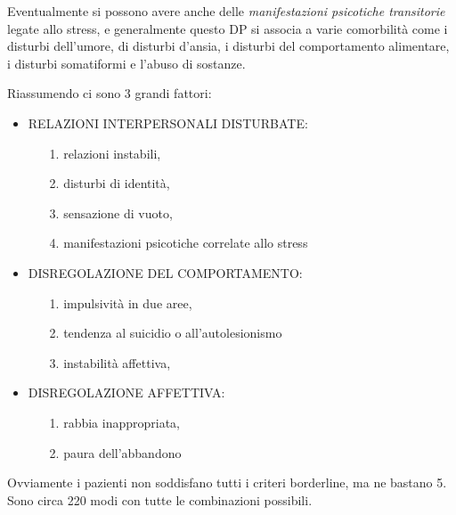 Eventualmente si possono avere anche delle \emph{manifestazioni
psicotiche transitorie} legate allo stress, e generalmente questo DP si
associa a varie comorbilità come i disturbi dell'umore, di disturbi
d'ansia, i disturbi del comportamento alimentare, i disturbi somatiformi
e l'abuso di sostanze.

Riassumendo ci sono 3 grandi fattori:

\begin{itemize}
\item
  RELAZIONI INTERPERSONALI DISTURBATE:

\begin{itemize}
\item[1.]
  relazioni instabili,
\item[2.]
  disturbi di identità,
\item[3.]
  sensazione di vuoto,
\item[4.]
  manifestazioni psicotiche correlate allo stress
\end{itemize}

\item
  DISREGOLAZIONE DEL COMPORTAMENTO:

\begin{itemize}
\item[1.]
  impulsività in due aree,
\item[2.]
  tendenza al suicidio o all'autolesionismo
\item[3.]
  instabilità affettiva,
\end{itemize}

\item
  DISREGOLAZIONE AFFETTIVA:

\begin{itemize}
\item[1.]
  rabbia inappropriata,
\item[2.]
  paura dell'abbandono
\end{itemize}
\end{itemize}

Ovviamente i pazienti non soddisfano tutti i criteri borderline, ma ne
bastano 5. Sono circa 220 modi con tutte le combinazioni possibili.

